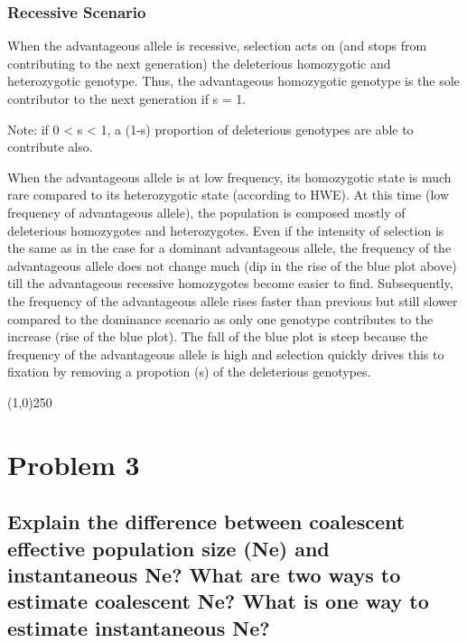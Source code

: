 \documentclass[]{article}
\begin{document}
\subsubsection{Recessive Scenario}\label{recessive-scenario}

When the advantageous allele is recessive, selection acts on (and stops
from contributing to the next generation) the deleterious homozygotic
and heterozygotic genotype. Thus, the advantageous homozygotic genotype
is the sole contributor to the next generation if s = 1.

Note: if 0 \textless{} s \textless{} 1, a (1-s) proportion of
deleterious genotypes are able to contribute also.

When the advantageous allele is at low frequency, its homozygotic state
is much rare compared to its heterozygotic state (according to HWE). At
this time (low frequency of advantageous allele), the population is
composed mostly of deleterious homozygotes and heterozygotes. Even if
the intensity of selection is the same as in the case for a dominant
advantageous allele, the frequency of the advantageous allele does not
change much (dip in the rise of the blue plot above) till the
advantageous recessive homozygotes become easier to find. Subsequently,
the frequency of the advantageous allele rises faster than previous but
still slower compared to the dominance scenario as only one genotype
contributes to the increase (rise of the blue plot). The fall of the
blue plot is steep because the frequency of the advantageous allele is
high and selection quickly drives this to fixation by removing a
propotion (s) of the deleterious genotypes.

\begin{center}
\line(1,0){250}
\end{center}

\pagebreak

\section{Problem 3}\label{problem-3}

\subsection{Explain the difference between coalescent effective
population size (Ne) and instantaneous Ne? What are two ways to estimate
coalescent Ne? What is one way to estimate instantaneous
Ne?}\label{explain-the-difference-between-coalescent-effective-population-size-ne-and-instantaneous-ne-what-are-two-ways-to-estimate-coalescent-ne-what-is-one-way-to-estimate-instantaneous-ne}
\end{document}

